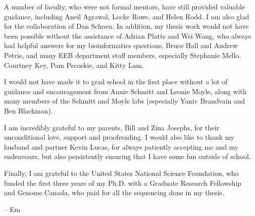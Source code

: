 \documentclass{ut-thesis}
\begin{document}
\begin{preliminary}
\begin{acknowledgements}
A number of faculty, who were not formal mentors, have still provided valuable guidance, including Aneil Agrawal, Locke Rowe, and Helen Rodd. I am also glad for the collaboration of Dan Schoen. In addition, my thesis work would not have been possible without the assistance of Adrian Platts and Wei Wang, who always had helpful answers for my bioinformatics questions, Bruce Hall and Andrew Petrie, and many EEB department staff members, especially Stephanie Mello, Courtney Key, Pam Pecoskie, and Kitty Lam. 

I would not have made it to grad school in the first place without a lot of guidance and encouragement from Annie Schmitt and Leonie Moyle, along with many members of the Schmitt and Moyle labs (especially Yaniv Brandvain and Ben Blackman).

I am incredibly grateful to my parents, Bill and Zina Josephs, for their unconditional love, support and proofreading. I would also like to thank my husband and partner Kevin Lucas, for always patiently accepting me and my endeavours, but also persistently ensuring that I have some fun outside of school.

Finally, I am grateful to the United States National Science Foundation, who funded the first three years of my Ph.D. with a Graduate Research Fellowship and Genome Canada, who paid for all the sequencing done in my thesis.

-- Em

\end{acknowledgements}

\tableofcontents

\listoftables

\listoffigures


\end{preliminary}


\end{document}
